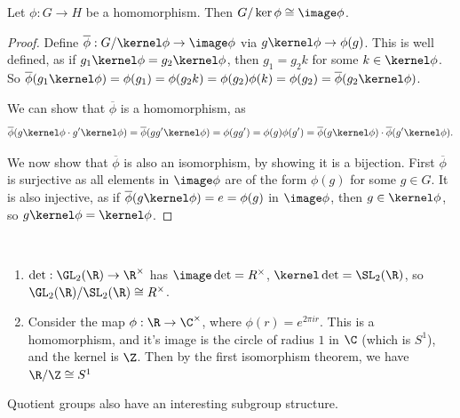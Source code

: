 \documentclass[a4]{scrreprt}
\begin{document}
\begin{theorem}
	Let $\phi : G \rightarrow H$ be a homomorphism. Then $G/\ker \phi \cong \image \phi$.
\end{theorem}
\begin{proof}
	Define $\overline{\phi} : G/\kernel \phi \rightarrow \image \phi$ via $g \kernel \phi \rightarrow \phi(g)$.
	This is well defined, as if $g_1 \kernel \phi = g_2 \kernel \phi$, then $g_1 = g_2k$ for some $k \in \kernel \phi$. So $\overline{\phi}(g_1 \kernel \phi) = \phi(g_1) = \phi(g_2 k) = \phi(g_2) \phi(k) = \phi(g_2) = \overline{\phi}(g_2 \kernel \phi)$.

	We can show that $\overline{\phi}$ is a homomorphism, as 
	$$
	\overline{\phi}(g \kernel \phi \cdot g' \kernel \phi) = \overline{\phi}(g g' \kernel \phi) = \phi(g g') = \phi(g) \phi(g') = \overline{\phi}(g \kernel \phi) \cdot \overline{\phi}(g' \kernel \phi).
	$$

	We now show that $\overline{\phi}$ is also an isomorphism, by showing it is a bijection. First $\overline{\phi}$ is surjective as all elements in $\image \phi$ are of the form $\phi(g)$ for some $g \in G$. It is also injective, as if $\overline{\phi}(g \kernel \phi) = e = \phi(g)$ in $\image \phi$, then $g \in \kernel \phi$, so $g \kernel \phi = \kernel \phi$.
\end{proof}

\begin{example}~
    \vspace*{-1.5\baselineskip}
\begin{enumerate}[label=(\roman*)]
    \item $\det : \GL_2(\R) \rightarrow \R^\times$ has $\image \det = R^\times$, $\kernel \det = \SL_2(\R)$, so $\GL_2(\R) / \SL_2(\R) \cong R^\times$.
    \item Consider the map $\phi : \R \rightarrow \C^\times$, where $\phi(r) = e^{2 \pi i r}$. This is a homomorphism, and it's image is the circle of radius $1$ in $\C$ (which is $S^1$), and the kernel is $\Z$. Then by the first isomorphism theorem, we have $\R/\Z \cong S^1$
\end{enumerate}
\end{example}

Quotient groups also have an interesting subgroup structure.
\end{document}
